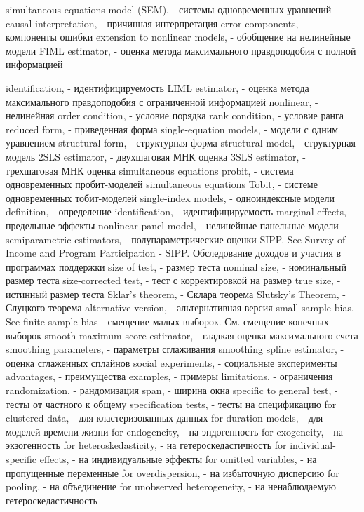 simultaneous equations model (SEM), - системы одновременных уравнений
causal interpretation, - причинная интерпретация
error components, - компоненты ошибки
extension to nonlinear models, - обобщение на нелинейные модели
FIML estimator, - оценка метода максимального правдоподобия с полной информацией

identification, - идентифицируемость
LIML estimator, - оценка метода максимального правдоподобия с ограниченной информацией
nonlinear, - нелинейная
order condition, - условие порядка
rank condition, - условие ранга
reduced form, - приведенная форма
single-equation models,  - модели с одним уравнением
structural form, - структурная форма
structural model, - структурная модель
2SLS estimator, - двухшаговая МНК оценка
3SLS estimator, - трехшаговая МНК оценка
simultaneous equations probit, - система одновременных пробит-моделей
simultaneous equations Tobit, - системе одновременных тобит-моделей
single-index models, - одноиндексные модели
definition, - определение
identification, - идентифицируемость
marginal effects, - предельные эффекты
nonlinear panel model, - нелинейные панельные модели
semiparametric estimators, - полупараметрические оценки
SIPP. See Survey of Income and Program Participation - SIPP. Обследование доходов и участия в программах поддержки
size of test, - размер теста
nominal size, - номинальный размер теста
size-corrected test, - тест с корректировкой на размер 
true size, - истинный размер теста
Sklar’s theorem, - Склара теорема
Slutsky’s Theorem, - Слуцкого теорема
alternative version, - альтернативная версия
small-sample bias. See finite-sample bias - смещение малых выборок. См. смещение конечных выборок
smooth maximum score estimator, - гладкая оценка максимального счета
smoothing parameters, - параметры сглаживания
smoothing spline estimator, - оценка сглаженных сплайнов
social experiments, - социальные эксперименты
advantages, - преимущества
examples, - примеры
limitations, - ограничения
randomization, - рандомизация
span, - ширина окна
specific to general test, - тесты от частного к общему
specification tests, - тесты на спецификацию
for clustered data, - для кластеризованных данных
for duration models, - для моделей времени жизни
for endogeneity, - на эндогенность
for exogeneity, - на экзогенность
for heteroskedasticity, - на гетероскедастичность
for individual-specific effects, - на индивидуальные эффекты
for omitted variables, - на пропущенные переменные
for overdispersion, - на избыточную дисперсию
for pooling, - на объединение
for unobserved heterogeneity, - на ненаблюдаемую гетероскедастичность
